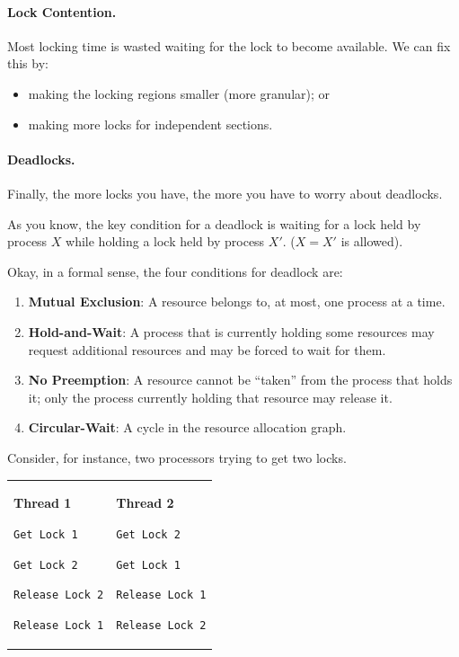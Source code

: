 \documentclass[a4paper]{report}
\begin{document}
\paragraph{Lock Contention.}
 Most locking time is wasted waiting for the lock to become available.
We can fix this by:
      \begin{itemize}
        \item making the locking regions smaller (more granular); or
        \item making more locks for independent sections.
      \end{itemize}

\paragraph{Deadlocks.} Finally, the more locks you have, the more you have to worry about deadlocks.

As you know, the key condition for a deadlock is waiting for a lock held by process $X$ while holding a lock held by process $X'$. ($X = X'$ is allowed).

Okay, in a formal sense, the four conditions for deadlock are:

\begin{enumerate}
	\item \textbf{Mutual Exclusion}: A resource belongs to, at most, one process at a time.
	\item \textbf{Hold-and-Wait}: A process that is currently holding some resources may request additional resources and may be forced to wait for them.
	\item \textbf{No Preemption}: A resource cannot be ``taken'' from the process that holds it; only the process currently holding that resource may release it.
	\item \textbf{Circular-Wait}: A cycle in the resource allocation graph.
\end{enumerate}


Consider, for instance, two processors trying to get two locks.

\begin{center}
  \begin{tabular}{ll}
\begin{minipage}{.4\textwidth}
      {\bf Thread 1}

      \verb+Get Lock 1+

      \verb+Get Lock 2+

      \verb+Release Lock 2+

      \verb+Release Lock 1+
\end{minipage} & 
\begin{minipage}{.4\textwidth}
      {\bf Thread 2}

      \verb+Get Lock 2+

      \verb+Get Lock 1+

      \verb+Release Lock 1+

      \verb+Release Lock 2+
\end{minipage}
\end{tabular}
\end{center}
\end{document}

